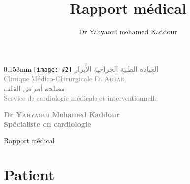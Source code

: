 \documentclass[12pt,a4paper]{article}
\author{Dr Yahyaoui mohamed Kaddour}
\title{Rapport médical }
\newcommand{\imagetext}[3][0.15]{%
    \begin{imagetextbox}[]{#1\textwidth}{3mm}%
      \texttt{[image: \#2]}%
      \tcblower%
	    #3%
    \end{imagetextbox}}
\begin{document}

  \imagetext{media/logo.png}{\textcolor{Gray}{\large{\textarabic{العيادة الطبية الجراحية الأبرار}}\\
      Clinique Médico-Chirurgicale \textsc{El Abrar}\\
      \textarabic{ مصلحة أمراض القلب}\\
      \small{Service de cardiologie médicale et interventionnelle}
    }}
  \begin{center}
    \textcolor{gray}{\textbf{ Dr \textsc{Yahyaoui} Mohamed Kaddour\\
        Spécialiste en cardiologie}\\
    }
  \end{center}

  \begin{center} \huge{Rapport médical}

  \end{center}


  \section{Patient}
\end{document}
